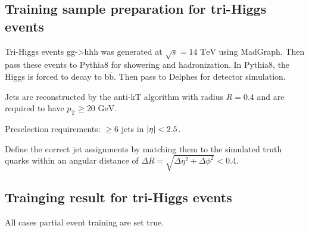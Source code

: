 \documentclass[12pt]{article}
\begin{document}
	\subsection{Training sample preparation for tri-Higgs events}%
	\label{sub:training_sample_preparation_for_tri_higgs_events}
		Tri-Higgs events gg->hhh was generated at $\sqrt{s} = \text{14 TeV}$ using MadGraph. Then pass these events to Pythia8 for showering and hadronization. In Pythia8, the Higgs is forced to decay to b$\overline{\text{b}}$. Then pass to Delphes for detector simulation.
	
		Jets are reconstructed by the anti-kT algorithm with radius $R=0.4$ and are required to have $p_\text{T}\ge \text{20 GeV}$.

		Preselection requirements: $\ge 6$ jets in  $\abs{\eta}<2.5$.

		Define the correct jet assignments by matching them to the simulated truth quarks within an angular distance of $\Delta R = \sqrt{\Delta\eta^2 + \Delta\phi^2}<0.4$.
	\subsection{Trainging result for tri-Higgs events}%
	\label{sub:trainging_result_for_tri_higgs_events}
		All cases partial event training are set true.
\end{document}
